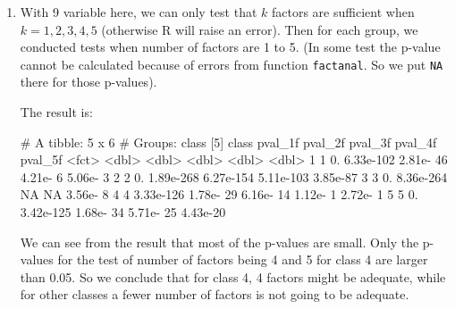 \documentclass{article}
\begin{document}
\begin{enumerate}[leftmargin = 0 em, label = \arabic*., font = \bfseries]
\item 
With 9 variable here, we can only test that $k$ factors are sufficient when $k = 1,2,3,4,5$ (otherwise R will raise an error). Then for each group, we conducted tests when number of factors are 1 to 5. (In some test the p-value cannot be calculated because of errors from function \verb|factanal|. So we put \verb|NA| there for those p-values).
The result is:
\begin{rcode}
# A tibble: 5 x 6
# Groups:   class [5]
  class   pval_1f   pval_2f    pval_3f    pval_4f  pval_5f
  <fct>     <dbl>     <dbl>      <dbl>      <dbl>    <dbl>
1 1     0.        6.33e-102  2.81e- 46  4.21e-  6 5.06e- 3
2 2     0.        1.89e-268  6.27e-154  5.11e-103 3.85e-87
3 3     0.        8.36e-264 NA         NA         3.56e- 8
4 4     3.33e-126 1.78e- 29  6.16e- 14  1.12e-  1 2.72e- 1
5 5     0.        3.42e-125  1.68e- 34  5.71e- 25 4.43e-20
\end{rcode}

We can see from the result that most of the p-values are small. Only the p-values for the test of number of factors being 4 and 5 for class 4 are larger than 0.05. So we conclude that for class 4, 4 factors might be adequate, while for other classes a fewer number of factors is not going to be adequate. 

 \end{enumerate}









	
	
	
	
\end{document}
